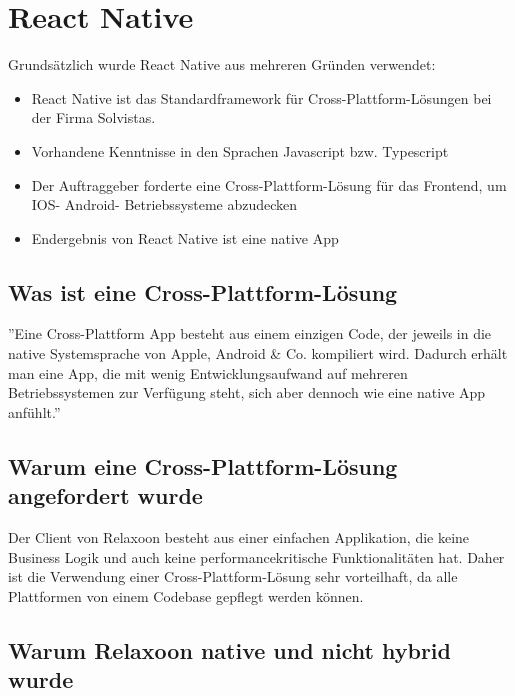 
\section{React Native}

Grundsätzlich wurde React Native aus mehreren Gründen verwendet:
\begin{itemize}
    \item React Native ist das Standardframework für Cross-Plattform-Lösungen bei der Firma Solvistas.
    \item Vorhandene Kenntnisse in den Sprachen Javascript bzw. Typescript
    \item Der Auftraggeber forderte eine Cross-Plattform-Lösung für das Frontend, um IOS- Android- Betriebssysteme abzudecken
    \item Endergebnis von React Native ist eine native App
\end{itemize}




\subsection{Was ist eine Cross-Plattform-Lösung}

''Eine Cross-Plattform App besteht aus einem einzigen Code,
der jeweils in die native Systemsprache von Apple, Android \& Co. kompiliert wird.
Dadurch erhält man eine App, die mit wenig Entwicklungsaufwand auf mehreren
Betriebssystemen zur Verfügung steht, sich aber dennoch wie eine native App
anfühlt.''
\cite{cross-plattform}




\subsection{Warum  eine Cross-Plattform-Lösung angefordert wurde}
Der Client von Relaxoon besteht aus einer einfachen Applikation, die keine Business Logik
und auch keine performancekritische Funktionalitäten hat.
Daher ist die Verwendung einer Cross-Plattform-Lösung sehr vorteilhaft,
da alle Plattformen von einem Codebase gepflegt werden können.



\subsection{Warum Relaxoon native und nicht hybrid wurde}

